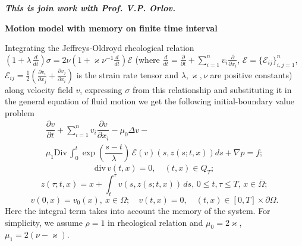 
\vzmscaption

\begin{center}
{\bf\small \it This is join work with Prof. V.P. Orlov.}
\end{center}

{\bf Motion model with memory on finite time interval}

Integrating the Jeffreys-Oldroyd rheological relation $(1+\lambda \, \frac{d}{ d t}) \sigma = 2 \nu (1+ \varkappa \nu ^ {- 1} \frac{d}{ d t}) \mathcal{E}$
(where $ \frac{d}{ dt} = \frac{\partial}{\partial t} + \sum\limits_{i = 1}^ nv_i \frac{\partial}{\partial x_i}$, $\mathcal{E} = $$ \{\mathcal{E} _ {ij} \} _ {i, j = 1}^ n $, $\mathcal{E} _ {ij} = \frac {1} {2} (\frac{\partial v_i} {\partial x_j} + \frac{\partial v_j}  {\partial x_i }) $ is the strain rate tensor  and $\lambda, \varkappa, \nu $ are positive constants) along velocity field $v$, expressing $\sigma$ from this relationship and substituting it in the general equation of fluid motion we get the following initial-boundary value problem
\begin{multline*} \label{1a}
\dfrac{\partial v} {\partial t} + \sum\limits_{i = 1}^ n v_i \dfrac{\partial v} {\partial x_i} -\mu_0 \Delta v-\\
\mu_1 \mathrm{Div} \, \int_0 ^ t \exp {\left(\dfrac{s-t} {\lambda}\right)} \, \mathcal{E} (v) \left(s, z (s; t, x)\right) ds + \nabla p = f;
\end{multline*}
\begin{equation*} \label{2a}
\mathrm {div} \, v (t, x) = 0, \quad (t, x)  \in Q_T;
\end{equation*}
\begin{equation*} \label{3a}
z (\tau; t, x) = x + \int_t^{ \tau} v \left(s, z (s; t, x)\right) \, ds, \, 0 \leqslant t, \tau \leqslant T, \, x  \in \overline {\Omega};
\end{equation*}
\begin{equation*} \label{4a}
v (0, x) = v _ 0 (x),\ x\in \Omega; \quad v (t, x) = 0, \quad (t, x)  \in [0, T] \times \partial \Omega.
\end{equation*}
Here the integral term takes into account the memory of the system.
For simplicity, we assume $\rho = 1 $ in rheological relation and $\mu_0 = 2 \varkappa $, $\mu_1 \! = \! 2 (\nu- \varkappa) $.

